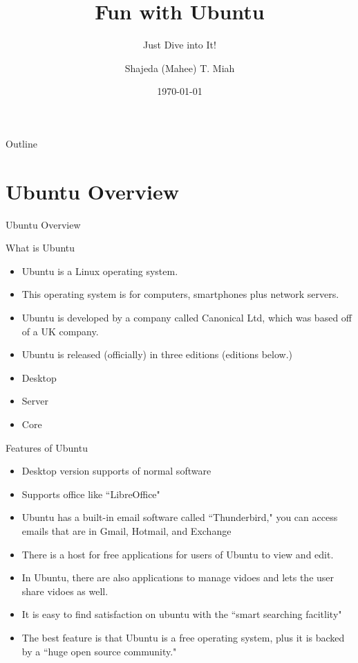 \documentclass[aspectratio=43]{beamer}
\title{Fun with Ubuntu} %
\subtitle{Just Dive into It!}
\author[S. T. Miah]{Shajeda (Mahee) T. Miah}
\institute[HGES]
\date{\today}
\begin{document}
    
    \frame{\titlepage}
    
    \begin{frame}{Outline}
        \tableofcontents
    \end{frame}

	\section{Ubuntu Overview}
			
	\begin{frame}{Ubuntu Overview}

\begin{block}{What is Ubuntu}
	\begin{itemize}
	\item  Ubuntu is a Linux operating system. 
	\item This operating system is for computers, smartphones plus network servers.
	\item Ubuntu is developed by a company called Canonical Ltd, which was based off of a UK company.
	\item Ubuntu is released (officially) in three editions (editions below.)
	
	\item Desktop
	\item Server
	\item Core
	\end{itemize}		
\end{block}
\end{frame}		
	
\begin{frame}{Features of Ubuntu}
\begin{itemize}
\item Desktop version supports of normal software 

\item Supports office like ``LibreOffice"

\item Ubuntu has a built-in email software called ``Thunderbird," you can access emails that are in Gmail, Hotmail, and Exchange

\item There is a host for free applications for users of Ubuntu to view and edit.

\item In Ubuntu, there are also applications to manage vidoes and lets the user share vidoes as well.

\item It is easy to find satisfaction on ubuntu with the ``smart searching facitlity"

\item The best feature is that Ubuntu is a free operating system, plus it is backed by a ``huge open source community."


\end{itemize}


\end{frame}	
\end{document}
